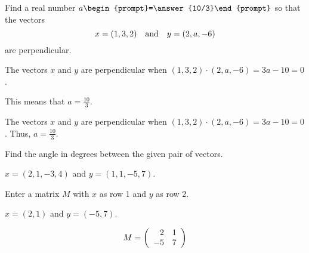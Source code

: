 \documentclass{ximera}
\begin{document}



\problemlabel

\begin{exercise} \label{c1.4.2}
Find a real number $a\begin{prompt}=\answer{10/3}\end{prompt}$ so that the vectors
\[
x = (1,3,2) \quad\mbox{and}\quad y = (2,a,-6)
\]
are perpendicular.
\begin{hint}
  The vectors $x$ and $y$ are perpendicular when
$(1,3,2) \cdot (2,a,-6) = 3a - 10 = 0$.
\end{hint}
\begin{hint}
  This means that $a = \frac{10}{3}$.
\end{hint}

\begin{solution}

The vectors $x$ and $y$ are perpendicular when $(1,3,2) \cdot (2,a,-6) = 3a - 10 = 0$.  Thus, $a = \frac{10}{3}$.

\end{solution}
\end{exercise}





\matlabproblemlabel

\noindent Find the angle in degrees between the given pair of vectors.

\begin{computerExercise} \label{c1.4.6a}
$x=(2,1,-3,4)$ and $y=(1,1,-5,7)$.

\end{computerExercise}





\matlabproblemlabel

\noindent Enter a matrix $M$ with $x$ as row 1 and $y$ as row 2.  

\begin{exercise}
$x=(2,1)$ and $y=(-5,7)$.

\begin{solution}
\[
M = \left(\begin{array}{rr} 2 & 1 \\ -5 & 7 \end{array}\right)
\]
\end{solution}
\end{exercise}


\end{document}
